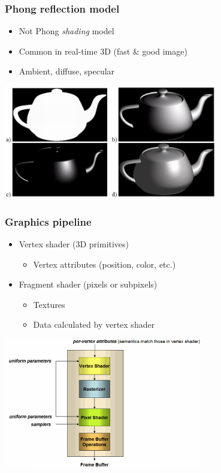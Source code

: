 \documentclass{beamer}
\begin{document}
\begin{frame}\frametitle{Phong reflection model}

\begin{itemize}
\item
  Not Phong \emph{shading} model
\item
  Common in real-time 3D (fast \& good image)
\item
  Ambient, diffuse, specular
\end{itemize}

\begin{center}
\includegraphics[width=0.7\textwidth]{ads.jpg}
\end{center}

\end{frame}

\begin{frame}\frametitle{Graphics pipeline}

\begin{itemize}
\item
  Vertex shader (3D primitives)

  \begin{itemize}
  \item
      Vertex attributes (position, color, etc.)
  \end{itemize}
\item
  Fragment shader (pixels or subpixels)

  \begin{itemize}
  \item
    Textures
  \item
    Data calculated by vertex shader
  \end{itemize}
\end{itemize}
\begin{center}
\includegraphics[width=0.65\textwidth]{pipeline.png}
\end{center}

\end{frame}
\end{document}
